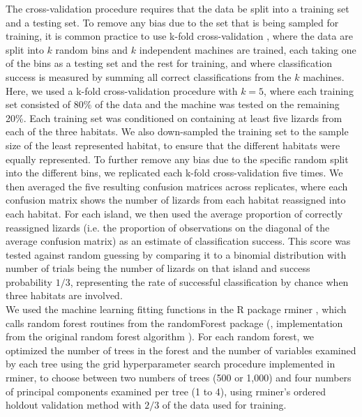 The cross-validation procedure requires that the data be split into a training set and a testing set. To remove any bias due to the set that is being sampled for training, it is common practice to use k-fold cross-validation \citep{James2013}, where the data are split into $k$ random bins and $k$ independent machines are trained, each taking one of the bins as a testing set and the rest for training, and where classification success is measured by summing all correct classifications from the $k$ machines.\\

Here, we used a k-fold cross-validation procedure with $k = 5$, where each training set consisted of 80\% of the data and the machine was tested on the remaining 20\%. Each training set was conditioned on containing at least five lizards from each of the three habitats. We also down-sampled the training set to the sample size of the least represented habitat, to ensure that the different habitats were equally represented. To further remove any bias due to the specific random split into the different bins, we replicated each k-fold cross-validation five times. We then averaged the five resulting confusion matrices across replicates, where each confusion matrix shows the number of lizards from each habitat reassigned into each habitat. For each island, we then used the average proportion of correctly reassigned lizards (i.e. the proportion of observations on the diagonal of the average confusion matrix) as an estimate of classification success. This score was tested against random guessing by comparing it to a binomial distribution with number of trials being the number of lizards on that island and success probability $1/3$, representing the rate of successful classification by chance when three habitats are involved.\\

We used the machine learning fitting functions in the R package rminer \citep{Cortez2020}, which calls random forest routines from the randomForest package (\citealt{Liaw2002}, implementation from the original random forest algorithm \citealp{Breiman2001}). For each random forest, we optimized the number of trees in the forest and the number of variables examined by each tree using the grid hyperparameter search procedure implemented in rminer, to choose between two numbers of trees (500 or 1,000) and four numbers of principal components examined per tree (1 to 4), using rminer's ordered holdout validation method with $2/3$ of the data used for training.\\

